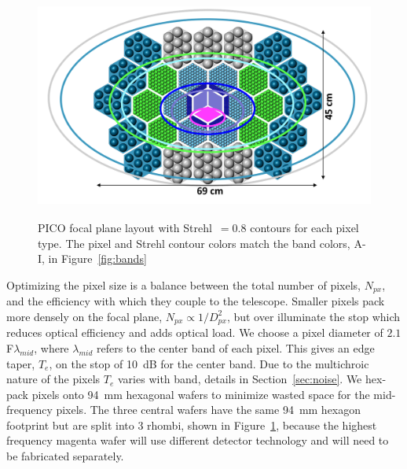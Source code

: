 \documentclass[]{spie}  %
\begin{document}
\begin{figure} [ht]
\begin{center}
\includegraphics[height=7.5cm]{version3_focal_plane.png}
\end{center}
\caption { \label{fig:focal_plane} 
PICO focal plane layout with Strehl~$=0.8$ contours for each pixel type. The pixel and Strehl contour colors match the band colors, A-I, 
in Figure~\ref{fig:bands} }
\end{figure} 

Optimizing the pixel size is a balance between the total number of pixels, $N_{px}$, and the efficiency with which they couple to the telescope. 
Smaller pixels pack more densely on the focal plane, $N_{px}\propto 1/D_{px}^2$, but over illuminate the stop which reduces optical efficiency 
and adds optical load.  
We choose a pixel diameter of $2.1$F$\lambda_{mid}$, where $\lambda_{mid}$ refers to the center 
band of each pixel. This gives an edge taper, $T_e$, on the stop of 10~dB for the center band. 
Due to the multichroic nature of the pixels $T_e$ varies with band, details in Section~\ref{sec:noise}. 
We hex-pack pixels onto 94~mm hexagonal wafers to minimize wasted space for the mid-frequency pixels. 
The three central wafers have the same 94~mm hexagon footprint but are split into 
3 rhombi, shown in Figure~\ref{fig:focal_plane}, because the highest frequency magenta wafer will use different 
detector technology and will need to be fabricated separately.  
\end{document}
